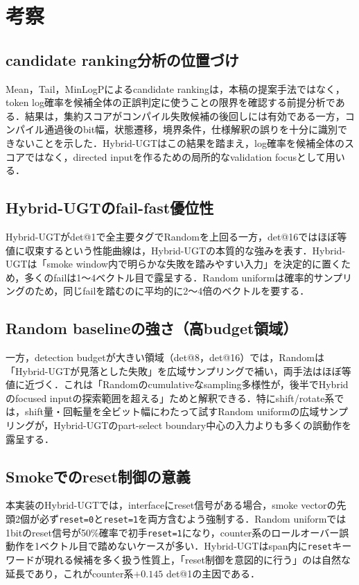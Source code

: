 \documentclass[submit,techrep,noauthor]{ipsj}
\begin{document}
\section{考察}

\subsection{candidate ranking分析の位置づけ}

Mean，Tail，MinLogPによるcandidate rankingは，本稿の提案手法ではなく，token log確率を候補全体の正誤判定に使うことの限界を確認する前提分析である．結果は，集約スコアがコンパイル失敗候補の後回しには有効である一方，コンパイル通過後のbit幅，状態遷移，境界条件，仕様解釈の誤りを十分に識別できないことを示した．Hybrid-UGTはこの結果を踏まえ，log確率を候補全体のスコアではなく，directed inputを作るための局所的なvalidation focusとして用いる．

\subsection{Hybrid-UGTのfail-fast優位性}

Hybrid-UGTがdet@1で全主要タグでRandomを上回る一方，det@16ではほぼ等値に収束するという性能曲線は，Hybrid-UGTの本質的な強みを表す．Hybrid-UGTは「smoke window内で明らかな失敗を踏みやすい入力」を決定的に置くため，多くのfailは1〜4ベクトル目で露呈する．Random uniformは確率的サンプリングのため，同じfailを踏むのに平均的に2〜4倍のベクトルを要する．

\subsection{Random baselineの強さ（高budget領域）}

一方，detection budgetが大きい領域（det@8，det@16）では，Randomは「Hybrid-UGTが見落とした失敗」を広域サンプリングで補い，両手法はほぼ等値に近づく．これは「Randomのcumulativeなsampling多様性が，後半でHybridのfocused inputの探索範囲を超える」ためと解釈できる．特にshift/rotate系では，shift量・回転量を全ビット幅にわたって試すRandom uniformの広域サンプリングが，Hybrid-UGTのpart-select boundary中心の入力よりも多くの誤動作を露呈する．

\subsection{Smokeでのreset制御の意義}

本実装のHybrid-UGTでは，interfaceにreset信号がある場合，smoke vectorの先頭2個が必ず\texttt{reset=0}と\texttt{reset=1}を両方含むよう強制する．Random uniformでは1bitのreset信号が50\%確率で初手\texttt{reset=1}になり，counter系のロールオーバー誤動作を1ベクトル目で踏めないケースが多い．Hybrid-UGTはspan内に\texttt{reset}キーワードが現れる候補を多く扱う性質上，「reset制御を意図的に行う」のは自然な延長であり，これがcounter系$+0.145$ det@1の主因である．
\end{document}
